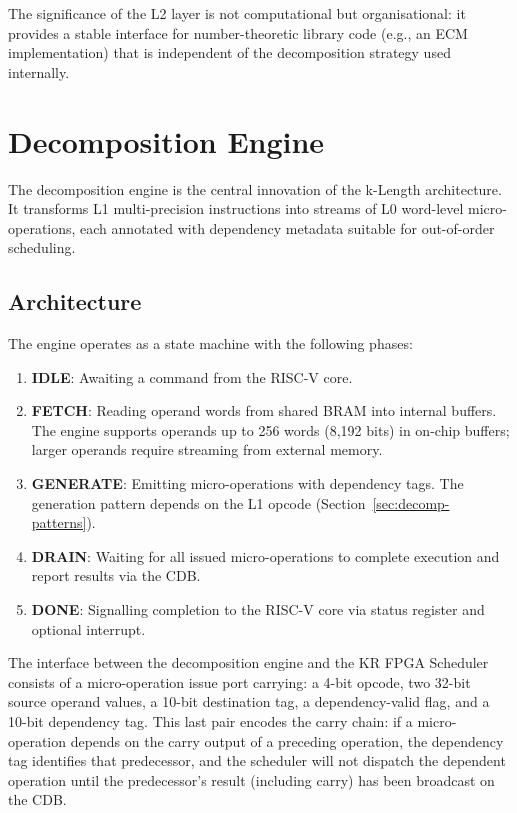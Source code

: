 \documentclass[11pt,a4paper]{article}
\begin{document}
The significance of the L2 layer is not computational but organisational:
it provides a stable interface for number-theoretic library code (e.g., an
ECM implementation) that is independent of the decomposition strategy used
internally.


\section{Decomposition Engine}
\label{sec:decomp}

The decomposition engine is the central innovation of the k-Length architecture.
It transforms L1 multi-precision instructions into streams of L0 word-level
micro-operations, each annotated with dependency metadata suitable for
out-of-order scheduling.

\subsection{Architecture}
\label{sec:decomp-arch}

The engine operates as a state machine with the following phases:

\begin{enumerate}[leftmargin=*]
  \item \textbf{IDLE}: Awaiting a command from the RISC-V core.
  \item \textbf{FETCH}: Reading operand words from shared BRAM into internal
    buffers.  The engine supports operands up to 256 words (8,192 bits) in
    on-chip buffers; larger operands require streaming from external memory.
  \item \textbf{GENERATE}: Emitting micro-operations with dependency tags.
    The generation pattern depends on the L1 opcode (Section~\ref{sec:decomp-patterns}).
  \item \textbf{DRAIN}: Waiting for all issued micro-operations to complete
    execution and report results via the CDB.
  \item \textbf{DONE}: Signalling completion to the RISC-V core via status
    register and optional interrupt.
\end{enumerate}

The interface between the decomposition engine and the KR FPGA Scheduler
consists of a micro-operation issue port carrying: a 4-bit opcode, two 32-bit
source operand values, a 10-bit destination tag, a dependency-valid flag, and
a 10-bit dependency tag.  This last pair encodes the carry chain: if a
micro-operation depends on the carry output of a preceding operation, the
dependency tag identifies that predecessor, and the scheduler will not dispatch
the dependent operation until the predecessor's result (including carry) has
been broadcast on the CDB.
\end{document}
